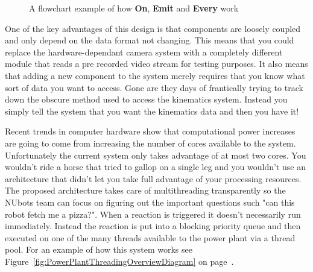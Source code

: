 \documentclass[english,12pt]{scrartcl}
\begin{document}
\begin{figure}[b]
                \caption {A flowchart example of how \textbf{On}, \textbf{Emit} and \textbf{Every}
                    work}
                \label{fig:OnAndEmitExample}
            \end{figure}
            
            One of the key advantages of this design is that components are loosely coupled and only
            depend on the data format not changing. This means that you could replace the
            hardware-dependant camera system with a completely different module that reads a pre
            recorded video stream for testing purposes. It also means that adding a new component to
            the system merely requires that you know what sort of data you want to access. Gone are
            they days of frantically trying to track down the obscure method used to access the
            kinematics system. Instead you simply tell the system that you want the kinematics data
            and then you have it!

            Recent trends in computer hardware show that computational power increases are going
            to come from increasing the number of cores available to the system. 
            Unfortunately the current system only takes advantage of at most two cores. 
            You wouldn't ride a horse that tried to gallop on a single leg and you wouldn't use an architecture
            that didn't let you take full advantage of your processing resources.
            The proposed architecture takes care of multithreading transparently so the NUbots team can
            focus on figuring out the important questions such "can this robot fetch me a pizza?".
            When a reaction is triggered it doesn't necessarily run immediately.
            Instead the reaction is put into a blocking priority queue and then executed on one of the many threads
            available to the power plant via a thread pool.
            For an example of how this system works see Figure~\ref{fig:PowerPlantThreadingOverviewDiagram} on
            page~\pageref{fig:PowerPlantThreadingOverviewDiagram}.
            
\end{document}
